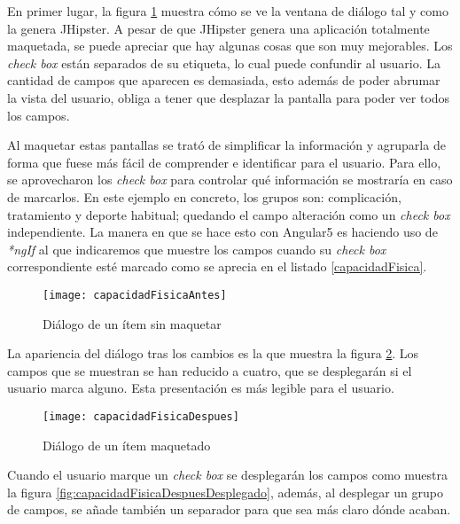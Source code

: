 En primer lugar, la figura \ref{fig:capacidadFisicaAntes} muestra cómo se ve la ventana de diálogo tal y como la genera JHipster. A pesar de que JHipster genera una aplicación totalmente maquetada, se puede apreciar que hay algunas cosas que son muy mejorables. Los \emph{check box} están separados de su etiqueta, lo cual puede confundir al usuario. La cantidad de campos que aparecen es demasiada, esto además de poder abrumar la vista del usuario, obliga a tener que desplazar la pantalla para poder ver todos los campos.



Al maquetar estas pantallas se trató de simplificar la información y agruparla de forma que fuese más fácil de comprender e identificar para el usuario. Para ello, se aprovecharon los \emph{check box} para controlar qué información se mostraría en caso de marcarlos. En este ejemplo en concreto, los grupos son: complicación, tratamiento y deporte habitual; quedando el campo alteración como un \emph{check box} independiente. La manera en que se hace esto con Angular5 es haciendo uso de \emph{*ngIf} al que indicaremos que muestre los campos cuando su \emph{check box} correspondiente esté marcado como se aprecia en el listado \ref{capacidadFisica}.



\begin{figure}[!h]
\begin{center}
\texttt{[image: capacidadFisicaAntes]}
\caption{Diálogo de un ítem sin maquetar}
\label{fig:capacidadFisicaAntes}
\end{center}
\end{figure}

La apariencia del diálogo tras los cambios es la que muestra la figura \ref{fig:capacidadFisicaDespues}. Los campos que se muestran se han reducido a cuatro, que se desplegarán si el usuario marca alguno. Esta presentación es más legible para el usuario.

\begin{figure}[!h]
\begin{center}
\texttt{[image: capacidadFisicaDespues]}
\caption{Diálogo de un ítem maquetado}
\label{fig:capacidadFisicaDespues}
\end{center}
\end{figure}

Cuando el usuario marque un \emph{check box} se desplegarán los campos como muestra la figura \ref{fig:capacidadFisicaDespuesDesplegado}, además, al desplegar un grupo de campos, se añade también un separador para que sea más claro dónde acaban. 

